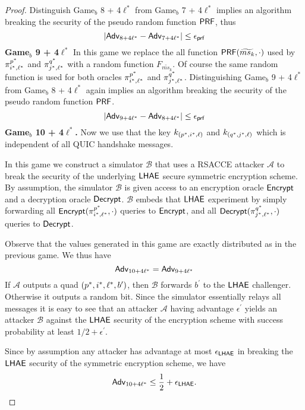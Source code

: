 \begin{proof}
 Distinguish Game$_b$ 8 + 4$\ell^{\ast}$ from Game$_b$ 7 + 4$\ell^{\ast}$ implies an algorithm breaking the security of the pseudo random function $\mathsf{PRF}$, thus
 \begin{equation}
  |\mathsf{Adv}_{8 + 4\ell^{\ast}} - \mathsf{Adv}_{7 + 4\ell^{\ast}}| \leq \epsilon_{\mathsf{prf}}
 \end{equation}%
%
%
 \textbf{Game$_b$ 9 + 4$\ell^{\ast}$} In this game we replace the all function $\mathsf{PRF}(\widetilde{ms_{k}}, \cdot)$ used by $\pi^{p^{\ast}}_{i^{\ast},\ell^{\ast}}$ and $\pi^{q^{\ast}}_{j^{\ast},\ell^{\ast}}$ with a random function $F_{\widetilde{ms_{k}}}$. Of course the same random function is used for both oracles $\pi^{p^{\ast}}_{i^{\ast},\ell^{\ast}}$ and $\pi^{q^{\ast}}_{j^{\ast},\ell^{\ast}}$. Distinguishing Game$_b$ 9 + 4$\ell^{\ast}$ from Game$_b$ 8 + 4$\ell^{\ast}$ again implies an algorithm breaking the security of the pseudo random function $\mathsf{PRF}$.
 \begin{equation}
  |\mathsf{Adv}_{9 + 4\ell^{\ast}} - \mathsf{Adv}_{8 + 4\ell^{\ast}}| \leq \epsilon_{\mathsf{prf}}
 \end{equation}%
%
%
 \textbf{Game$_b$ 10 + 4$\ell^{\ast}$.} Now we use that the key $k_{(p^{\ast}, i^{\ast}, \ell)}$ and $k_{(q^{\ast}, j^{\ast}, \ell)}$ which is independent of all QUIC handshake messages.

 In this game we construct a simulator $\mathcal{B}$ that uses a RSACCE attacker $\mathcal{A}$ to break the security of the underlying $\mathsf{LHAE}$ secure symmetric encryption scheme. By assumption, the simulator $\mathcal{B}$ is given access to an encryption oracle $\mathsf{Encrypt}$ and a decryption oracle $\mathsf{Decrypt}$. $\mathcal{B}$ embeds that $\mathsf{LHAE}$ experiment by simply forwarding all $\mathsf{Encrypt}(\pi^{p^{\ast}}_{i^{\ast},\ell^{\ast}},\cdot)$ queries to $\mathsf{Encrypt}$, and all $\mathsf{Decrypt}(\pi^{q^{\ast}}_{j^{\ast},\ell^{\ast}},\cdot)$ queries to $\mathsf{Decrypt}$.

 Observe that the values generated in this game are exactly distributed as in the previous game. We thus have
 \begin{equation}
  \mathsf{Adv}_{10 + 4\ell^{\ast}} = \mathsf{Adv}_{9 + 4\ell^{\ast}}
 \end{equation}%
 If $\mathcal{A}$ outputs a quad $(p^{\ast}, i^{\ast}, \ell^{\ast}, b^{\prime})$, then $\mathcal{B}$ forwards $b^{\prime}$ to the $\mathsf{LHAE}$ challenger. Otherwise it outputs a random bit. Since the simulator essentially relays all messages it is easy to see that an attacker $\mathcal{A}$ having advantage $\epsilon^{\prime}$ yields an attacker $\mathcal{B}$ against the $\mathsf{LHAE}$ security of the encryption scheme with success probability at least $1/2 + \epsilon^{\prime}$.

 Since by assumption any attacker has advantage at most $\epsilon_{\mathsf{LHAE}}$ in breaking the $\mathsf{LHAE}$ security of the symmetric encryption scheme, we have
 \begin{equation}
  \mathsf{Adv}_{10 + 4\ell^{\ast}} \leq \frac{1}{2} + \epsilon_{\mathsf{LHAE}}.
 \end{equation}%
\end{proof}